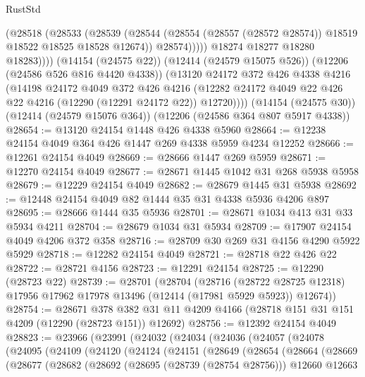 \begin{lexlean}{RustStd}
\begin{coremodule}
                  (@28518
                    (@28533
                      (@28539
                        (@28544
                          (@28554 (@28557 (@28572 @28574)) @18519 @18522 @18525 @18528 @12674))
                        @28574)))))
              @18274
              @18277
              @18280
              @18283))))
      (@14154 (@24575 @22))
      (@12414 (@24579 @15075 @526))
      (@12206 (@24586 @526 @816 @4420 @4338))
      (@13120
        @24172
        @372
        @426
        @4338
        @4216
        (@14198
          @24172
          @4049
          @372
          @426
          @4216
          (@12282 @24172 @4049 @22 @426 @22 @4216 (@12290 (@12291 @24172 @22)) @12720))))
    (@14154 (@24575 @30))
    (@12414 (@24579 @15076 @364))
    (@12206 (@24586 @364 @807 @5917 @4338))
@28654 := @13120 @24154 @1448 @426 @4338 @5960
@28664 := @12238 @24154 @4049 @364 @426 @1447 @269 @4338 @5959 @4234 @12252
@28666 := @12261 @24154 @4049
@28669 := @28666 @1447 @269 @5959
@28671 := @12270 @24154 @4049
@28677 := @28671 @1445 @1042 @31 @268 @5938 @5958
@28679 := @12229 @24154 @4049
@28682 := @28679 @1445 @31 @5938
@28692 := @12448 @24154 @4049 @82 @1444 @35 @31 @4338 @5936 @4206 @897
@28695 := @28666 @1444 @35 @5936
@28701 := @28671 @1034 @413 @31 @33 @5934 @4211
@28704 := @28679 @1034 @31 @5934
@28709 := @17907 @24154 @4049 @4206 @372 @358
@28716 := @28709 @30 @269 @31 @4156 @4290 @5922 @5929
@28718 := @12282 @24154 @4049
@28721 := @28718 @22 @426 @22
@28722 := @28721 @4156
@28723 := @12291 @24154
@28725 := @12290 (@28723 @22)
@28739 := @28701
    (@28704
      (@28716
        (@28722 @28725 @12318)
        @17956
        @17962
        @17978
        @13496
        (@12414 (@17981 @5929 @5923))
        @12674))
@28754 := @28671
    @378
    @382
    @31
    @11
    @4209
    @4166
    (@28718 @151 @31 @151 @4209 (@12290 (@28723 @151)) @12692)
@28756 := @12392 @24154 @4049
@28823 := @23966
    (@23991
      (@24032
        (@24034
          (@24036
            (@24057
              (@24078
                (@24095
                  (@24109
                    (@24120
                      (@24124
                        (@24151
                          (@28649
                            (@28654
                              (@28664
                                (@28669
                                  (@28677
                                    (@28682
                                      (@28692
                                        (@28695 (@28739 (@28754 @28756)))
                                        @12660
                                        @12663

\end{coremodule}
\end{lexlean}
